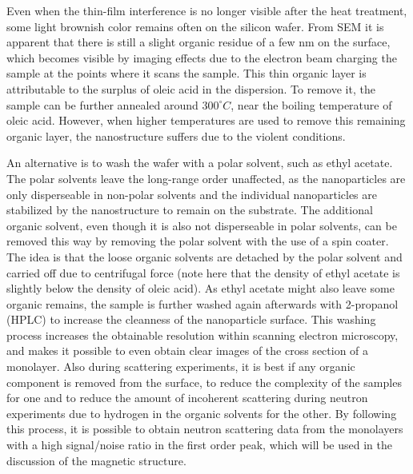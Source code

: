 \documentclass[\main/dresen_thesis.tex]{subfiles}
\begin{document}
  Even when the thin-film interference is no longer visible after the heat treatment, some light brownish color remains often on the silicon wafer.
  From SEM it is apparent that there is still a slight organic residue of a few nm on the surface, which becomes visible by imaging effects due to the electron beam charging the sample at the points where it scans the sample.
  This thin organic layer is attributable to the surplus of oleic acid in the dispersion.
  To remove it, the sample can be further annealed around $300 ^\circ C$, near the boiling temperature of oleic acid.
  However, when higher temperatures are used to remove this remaining organic layer, the nanostructure suffers due to the violent conditions.

  An alternative is to wash the wafer with a polar solvent, such as ethyl acetate.
  The polar solvents leave the long-range order unaffected, as the nanoparticles are only disperseable in non-polar solvents and the individual nanoparticles are stabilized by the nanostructure to remain on the substrate.
  The additional organic solvent, even though it is also not disperseable in polar solvents, can be removed this way by removing the polar solvent with the use of a spin coater.
  The idea is that the loose organic solvents are detached by the polar solvent and carried off due to centrifugal force (note here that the density of ethyl acetate is slightly below the density of oleic acid).
  As ethyl acetate might also leave some organic remains, the sample is further washed again afterwards with 2-propanol (HPLC) to increase the cleanness of the nanoparticle surface.
  This washing process increases the obtainable resolution within scanning electron microscopy, and makes it possible to even obtain clear images of the cross section of a monolayer.
  Also during scattering experiments, it is best if any organic component is removed from the surface, to reduce the complexity of the samples for one and to reduce the amount of incoherent scattering during neutron experiments due to hydrogen in the organic solvents for the other.
  By following this process, it is possible to obtain neutron scattering data from the monolayers  with a high signal/noise ratio in the first order peak, which will be used in the discussion of the magnetic structure.
\end{document}
